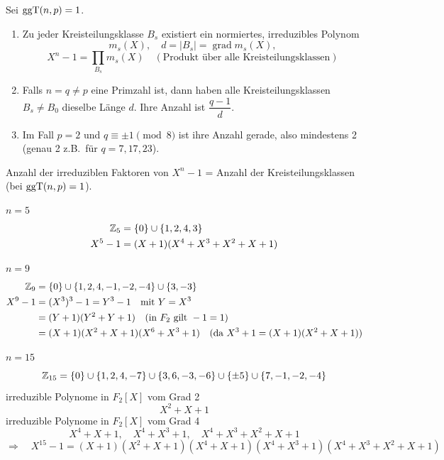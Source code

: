 \begin{satz}
Sei $\operatorname{ggT}(n, p) = 1$.
\begin{enumerate}[label=\alph*)]
\item Zu jeder Kreisteilungsklasse $B_s$ existiert ein normiertes, irreduzibles Polynom
\[
m_s(X), \quad d = |B_s| = \operatorname{grad} m_s(X), \]\[ X^n - 1 = \prod_{B_s} m_s(X) \quad (\text{Produkt über alle Kreisteilungsklassen})
\]
\item Falls $n = q \neq p$ eine Primzahl ist, dann haben alle Kreisteilungsklassen $B_s \neq B_0$ dieselbe Länge $d$. Ihre Anzahl ist $\dfrac{q-1}{d}$.
\item Im Fall $p = 2$ und $q \equiv \pm 1 \pmod 8$ ist ihre Anzahl gerade, also mindestens 2 (genau 2 z.B.\ für $q = 7, 17, 23$).
\end{enumerate}
\end{satz}

Anzahl der irreduziblen Faktoren von $X^n - 1$ = Anzahl der Kreisteilungsklassen (bei $\operatorname{ggT}(n, p) = 1$).

\begin{beispiel}[{$X^n - 1 \in F_2[X]$, $p = 2$}]\leavevmode

$n = 5$
\begin{align*}
\mathbb{Z}_{5} &= \{0\} \cup \{1, 2, 4, 3\} \\
X^5 - 1 &= (X + 1)(X^4 + X^3 + X^2 + X + 1)
\end{align*}

$n = 9$
\begin{align*}
\mathbb{Z}_{9} &= \{0\} \cup \{1, 2, 4, -1, -2, -4\} \cup \{3, -3\} \\
X^9 - 1 &= (X^3)^3 - 1 = Y^3 - 1 \quad \text{mit } Y = X^3 \\
&= (Y + 1)(Y^2 + Y + 1) \quad (\text{in } F_2 \text{ gilt } -1 = 1) \\
&= (X + 1)(X^2 + X + 1)(X^6 + X^3 + 1) \quad (\text{da } X^3 + 1 = (X + 1)(X^2 + X + 1))
\end{align*}

$n = 15$
\[
\mathbb{Z}_{15} = \{0\} \cup \{1, 2, 4, -7\} \cup \{3, 6, -3, -6\} \cup \{\pm 5\} \cup \{7, -1, -2, -4\}
\]
irreduzible Polynome in $F_2[X]$ vom Grad 2
\[
X^2 + X + 1
\]
irreduzible Polynome in $F_2[X]$ vom Grad 4
\[
X^4 + X + 1, \quad X^4 + X^3 + 1, \quad X^4 + X^3 + X^2 + X + 1
\]
\[
\Rightarrow\quad X^{15} - 1 = (X + 1)(X^2 + X + 1)(X^4 + X + 1)(X^4 + X^3 + 1)(X^4 + X^3 + X^2 + X + 1)
\]
\end{beispiel}

